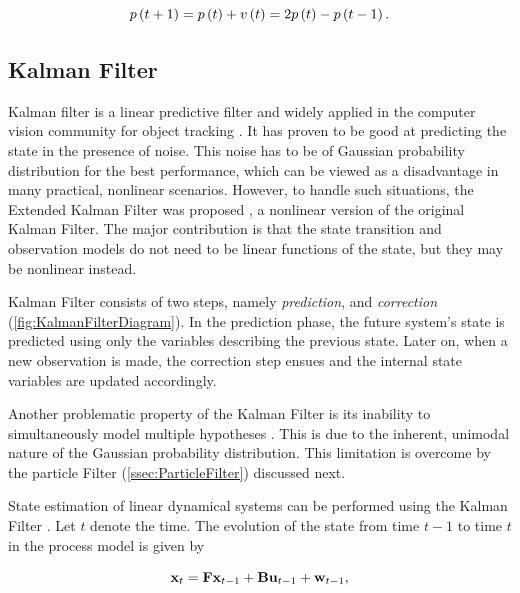 \begin{equation}
    \label{eq:TrivialMotionModel}
    {p} \left( t + 1 \right) = {p} \left( t \right) + {v} \left( t \right) = 2{p} \left( t \right) - {p} \left( t - 1 \right).
\end{equation}

\subsection{Kalman Filter}
\label{ssec:KalmanFiler}

Kalman filter \cite{Kalman1960, welch1995introduction} is a linear predictive filter and widely applied in the computer vision community for object tracking \cite{Jalal2012}. It has proven to be good at predicting the state in the presence of noise. This noise has to be of Gaussian probability distribution for the best performance, which can be viewed as a disadvantage in many practical, nonlinear scenarios. However, to handle such situations, the Extended Kalman Filter was proposed \cite{welch1995introduction}, a nonlinear version of the original Kalman Filter. The major contribution is that the state transition and observation models do not need to be linear functions of the state, but they may be nonlinear instead.

Kalman Filter consists of two steps, namely \emph{prediction}, and \emph{correction} (\cref{fig:KalmanFilterDiagram}). In the prediction phase, the future system's state is predicted using only the variables describing the previous state. Later on, when a new observation is made, the correction step ensues and the internal state variables are updated accordingly.

Another problematic property of the Kalman Filter is its inability to simultaneously model multiple hypotheses \cite{welch1995introduction}. This is due to the inherent, unimodal nature of the Gaussian probability distribution. This limitation is overcome by the particle Filter (\cref{ssec:ParticleFilter}) discussed next.

State estimation of linear dynamical systems can be performed using the Kalman Filter \cite{kim2018introduction}. Let $t$ denote the time. The evolution of the state from time $t - 1$ to time $t$ in the process model is given by

\begin{equation}
    \mathbf{x}_t = \mathbf{F} \mathbf{x}_{t - 1} + \mathbf{B} \mathbf{u}_{t - 1} + \mathbf{w}_{t - 1},
\end{equation}

